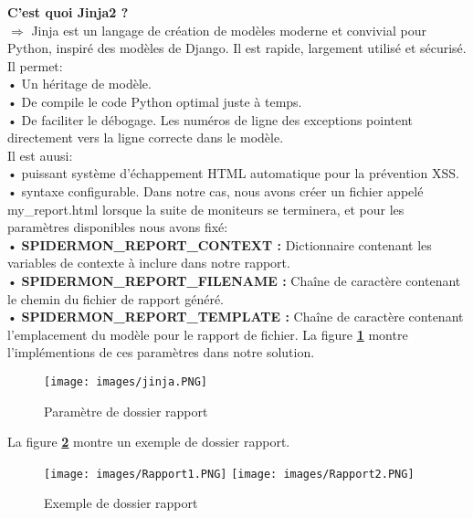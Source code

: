 \textbf{C'est quoi Jinja2 ?}\\
$\Rightarrow$ Jinja est un langage de création de modèles moderne et convivial pour Python, inspiré des modèles de Django. Il est rapide, largement utilisé et sécurisé.\\ Il permet: \\
\indent• Un héritage de modèle.\\
\indent• De compile le code Python optimal juste à temps.\\
\indent• De faciliter le débogage. Les numéros de ligne des exceptions pointent directement vers la ligne correcte dans le modèle.\\
Il est auusi:\\
\indent• puissant système d'échappement HTML automatique pour la prévention XSS.\\
\indent• syntaxe configurable.
Dans notre cas, nous avons créer un fichier appelé my\_report.html lorsque la suite de moniteurs se terminera, et pour les paramètres disponibles nous avons fixé:\\
• \textbf{SPIDERMON\_REPORT\_CONTEXT :} Dictionnaire contenant les variables de contexte à inclure dans notre rapport.\\
• \textbf{SPIDERMON\_REPORT\_FILENAME :} Chaîne de caractère contenant le chemin du fichier de rapport généré.\\
• \textbf{SPIDERMON\_REPORT\_TEMPLATE :} Chaîne de caractère contenant l'emplacement du modèle pour le rapport de fichier.
\noindent La figure \textbf{\ref{fig:jinja}} montre l'implémentions de ces paramètres dans notre solution.
\begin{figure}[H]
            \centering
            \texttt{[image: images/jinja.PNG]}
            \caption{Paramètre de dossier rapport}
            \label{fig:jinja}  
        \end{figure}
\noindent La figure \textbf{\ref{rapport}} montre un exemple de dossier rapport.
\begin{figure}[H]
\texttt{[image: images/Rapport1.PNG]}\hfill 
\texttt{[image: images/Rapport2.PNG]} 
\caption{Exemple de dossier rapport}\label{rapport} 
\end{figure} 
